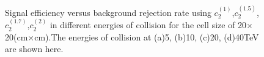 \begin{figure}
\begin{center}

\end{center}
\caption{Signal efficiency versus background rejection rate using $c_2^{(1)}$,$c_2^{(1.5)}$,$c_2^{(1.7)}$,$c_2^{(2)}$ in different energies of collision for the cell size of  20$\times$20(cm$\times$cm).The energies of collision at (a)5, (b)10, (c)20, (d)40TeV are shown here.}
\label{fig:cluster_r010_c_variable}
\end{figure}

